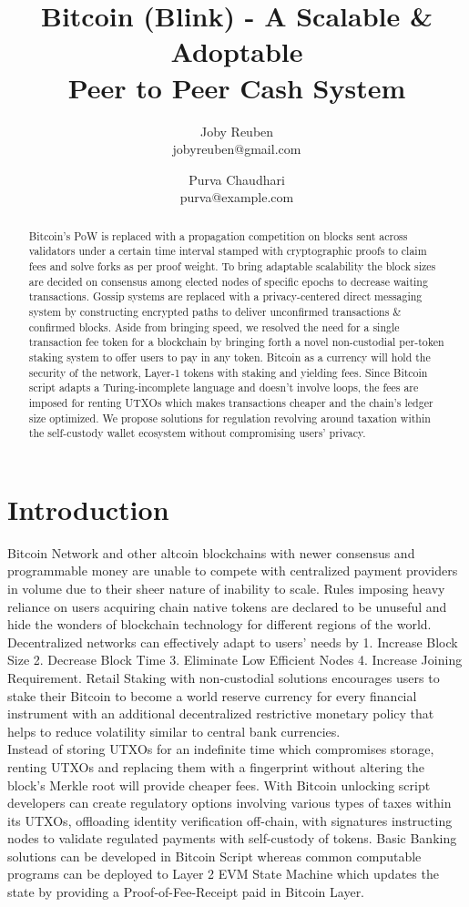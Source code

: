 \documentclass[a4paper,11pt]{article}
\title{
\myfont Bitcoin (Blink) - A Scalable \& Adoptable \\
Peer to Peer Cash System}
\author{ \myfontt Joby Reuben \\ jobyreuben@gmail.com \and Purva Chaudhari \\ purva@example.com}
\date{}
\begin{document}
\maketitle
\begin{abstract}
Bitcoin's PoW is replaced with a propagation competition on blocks sent across validators under a certain time interval stamped with cryptographic proofs to claim fees and solve forks as per proof weight. To bring adaptable scalability the block sizes are decided on consensus among elected nodes of specific epochs to decrease waiting transactions. Gossip systems are replaced with a privacy-centered direct messaging system by constructing encrypted paths to deliver unconfirmed transactions \& confirmed blocks. Aside from bringing speed, we resolved the need for a single transaction fee token for a blockchain by bringing forth a novel non-custodial per-token staking system to offer users to pay in any token. Bitcoin as a currency will hold the security of the network, Layer-1 tokens with staking and yielding fees. Since Bitcoin script adapts a Turing-incomplete language and doesn't involve loops, the fees are imposed for renting UTXOs which makes transactions cheaper and the chain's ledger size optimized. We propose solutions for regulation revolving around taxation within the self-custody wallet ecosystem without compromising users' privacy. 

\end{abstract}

\section{Introduction}

Bitcoin Network and other altcoin blockchains with newer consensus and programmable money are unable to compete with centralized payment providers in volume due to their sheer nature of inability to scale. Rules imposing heavy reliance on users acquiring chain native tokens are declared to be unuseful and hide the wonders of blockchain technology for different regions of the world. Decentralized networks can effectively adapt to users' needs by 1. Increase Block Size 2. Decrease Block Time 3. Eliminate Low Efficient Nodes 4. Increase Joining Requirement. Retail Staking with non-custodial solutions encourages users to stake their Bitcoin to become a world reserve currency for every financial instrument with an additional decentralized restrictive monetary policy that helps to reduce volatility similar to central bank currencies.\\
\indent Instead of storing UTXOs for an indefinite time which compromises storage, renting UTXOs and replacing them with a fingerprint without altering the block's Merkle root will provide cheaper fees. With Bitcoin unlocking script developers can create regulatory options involving various types of taxes within its UTXOs, offloading identity verification off-chain, with signatures instructing nodes to validate regulated payments with self-custody of tokens. Basic Banking solutions can be developed in Bitcoin Script whereas common computable programs can be deployed to Layer 2 EVM State Machine which updates the state by providing a Proof-of-Fee-Receipt paid in Bitcoin Layer. 
\end{document}
